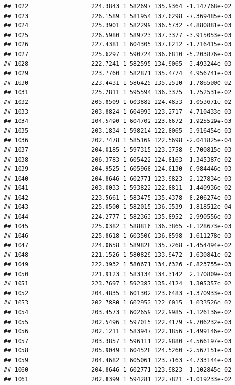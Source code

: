\documentclass[
]{article}
\begin{document}
\begin{verbatim}
## 1022                  224.3843 1.582697 135.9364 -1.147768e-02
## 1023                  226.1589 1.581954 137.0298 -7.369485e-03
## 1024                  225.3901 1.582299 136.5732 -4.880881e-03
## 1025                  226.5980 1.589723 137.3377 -3.915053e-03
## 1026                  227.4381 1.604305 137.8212 -1.716415e-03
## 1027                  225.6297 1.590724 136.6810 -5.203876e-03
## 1028                  222.7241 1.582595 134.9065 -3.493244e-03
## 1029                  223.7760 1.582871 135.4774  4.956741e-03
## 1030                  223.4431 1.586425 135.2510  1.786500e-02
## 1031                  225.2811 1.595594 136.3375  1.752531e-02
## 1032                  205.8509 1.603882 124.4853  1.053671e-02
## 1033                  203.8824 1.604993 123.2717  4.710433e-03
## 1034                  204.5490 1.604702 123.6672  1.925529e-03
## 1035                  203.1834 1.598214 122.8065  3.916454e-03
## 1036                  202.7478 1.585169 122.5698 -2.041825e-04
## 1037                  204.0185 1.597315 123.3758  9.700815e-03
## 1038                  206.3783 1.605422 124.8163  1.345387e-02
## 1039                  204.9525 1.605968 124.0130  6.984446e-03
## 1040                  204.8646 1.602771 123.9823 -2.127834e-03
## 1041                  203.0033 1.593822 122.8811 -1.440936e-02
## 1042                  223.5661 1.583475 135.4378 -8.206274e-03
## 1043                  225.0500 1.582015 136.3539  1.818512e-04
## 1044                  224.2777 1.582363 135.8952  2.990556e-03
## 1045                  225.0382 1.588816 136.3865 -8.128673e-03
## 1046                  225.8618 1.603506 136.8598 -1.611278e-03
## 1047                  224.0658 1.589828 135.7268 -1.454494e-02
## 1048                  221.1526 1.580829 133.9472 -1.630841e-02
## 1049                  222.3932 1.580671 134.6326 -8.823755e-03
## 1050                  221.9123 1.583134 134.3142  2.170809e-03
## 1051                  223.7697 1.592387 135.4124  1.305357e-02
## 1052                  204.4835 1.601302 123.6483 -1.370933e-03
## 1053                  202.7880 1.602952 122.6015 -1.033526e-02
## 1054                  203.4573 1.602659 122.9985 -1.126136e-02
## 1055                  202.5496 1.597015 122.4179 -9.706232e-03
## 1056                  202.1211 1.583947 122.1856 -1.499146e-02
## 1057                  203.3857 1.596111 122.9880 -4.566197e-03
## 1058                  205.9049 1.604528 124.5260 -2.567151e-03
## 1059                  204.4682 1.605061 123.7163 -4.733144e-03
## 1060                  204.8646 1.602771 123.9823 -1.102845e-02
## 1061                  202.8399 1.594281 122.7821 -1.019233e-02

\end{verbatim}
\end{document}
